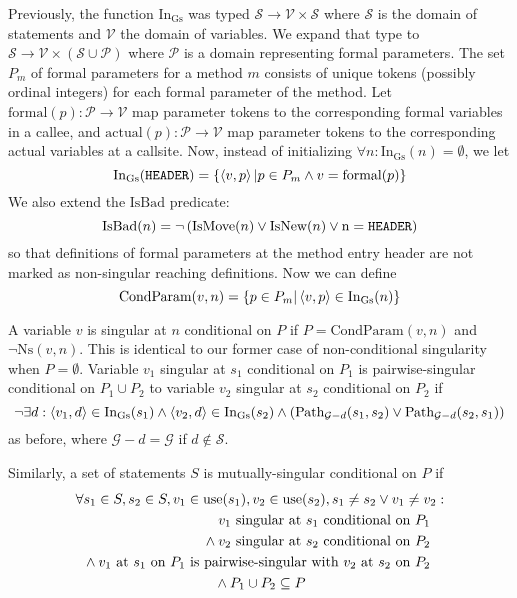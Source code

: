\documentclass[11pt,notitlepage]{article}
\begin{document}
Previously, the function $\text{In}_\text{Gs}$ was typed
$\mathcal{S\to V\times S}$
where $\mathcal{S}$ is the domain of statements
and $\mathcal{V}$ the domain of variables.
We expand that type to
$\mathcal{S\to V\times (S\cup P)}$ where $\mathcal{P}$ is a domain
representing formal parameters.  The set $P_m$ of formal parameters for
a method $m$ consists of unique tokens (possibly ordinal integers) for
each formal parameter of the method.  Let
$\text{formal}(p):\mathcal{P\to V}$ map parameter tokens to the
corresponding formal variables in a callee, and
$\text{actual}(p):\mathcal{P\to V}$ map parameter tokens to the
corresponding actual variables at a callsite.
Now, instead of initializing $\forall n :
\text{In}_\text{Gs}(n)=\emptyset$, we let
\begin{displaymath}
\text{In}_\text{Gs}(\text{\tt HEADER}) =
   \left\{ \left\langle v,p \right\rangle | p\in P_m \wedge v=\text{formal}(p) \right\}
\end{displaymath}
We also extend the $\text{IsBad}$ predicate:
\begin{displaymath}
\text{IsBad}(n) = \neg\left(\text{IsMove}(n) \vee \text{IsNew}(n) \vee
                            \text n = \text{\tt HEADER} \right)
\end{displaymath}
so that definitions of formal parameters at the method entry header
are not marked as non-singular reaching definitions.  Now we can define
\begin{displaymath}
\text{CondParam}(v,n) =
    \left\{ p\in P_m | \left\langle v,p \right\rangle\in \text{In}_\text{Gs}(n) \right\}
\end{displaymath}

A variable $v$ is singular at $n$ conditional on $P$ if
$P=\text{CondParam}(v,n)$ and $\neg\text{Ns}(v,n)$.  This
is identical to our former case of non-conditional singularity
when $P=\emptyset$.  Variable $v_1$ singular at $s_1$ conditional on
$P_1$ is pairwise-singular conditional on $P_1\cup P_2$ to variable
$v_2$ singular at $s_2$ conditional on $P_2$ if
\begin{displaymath}
\neg\exists 
     d : \left\langle v_1, d \right\rangle \in \text{In}_\text{Gs}(s_1) \wedge
         \left\langle v_2, d \right\rangle \in \text{In}_\text{Gs}(s_2) \wedge
\left(\text{Path}_{\mathcal{G}-d}(s_1, s_2) \vee
      \text{Path}_{\mathcal{G}-d}(s_2, s_1) \right)
\end{displaymath}
as before, where $\mathcal{G}-d=\mathcal{G}$ if $d\notin\mathcal{S}$.

Similarly, a set of statements $S$ is mutually-singular conditional on $P$
if
\begin{multline*}
\forall s_1 \in S, s_2 \in S, v_1 \in \text{use}(s_1), v_2 \in \text{use}(s_2),
  s_1 \neq s_2 \vee v_1 \neq v_2:
\\\shoveright{
v_1 \text{ singular at } s_1 \text{ conditional on } P_1
}\\\shoveright{{}\wedge
v_2 \text{ singular at } s_2 \text{ conditional on } P_2
}\\\shoveright{{}\wedge
v_1 \text{ at } s_1 \text{ on } P_1
\text{ is pairwise-singular with }
v_2 \text{ at } s_2 \text{ on } P_2
}\\{}\wedge
P_1 \cup P_2 \subseteq P
\end{multline*}
\end{document}

